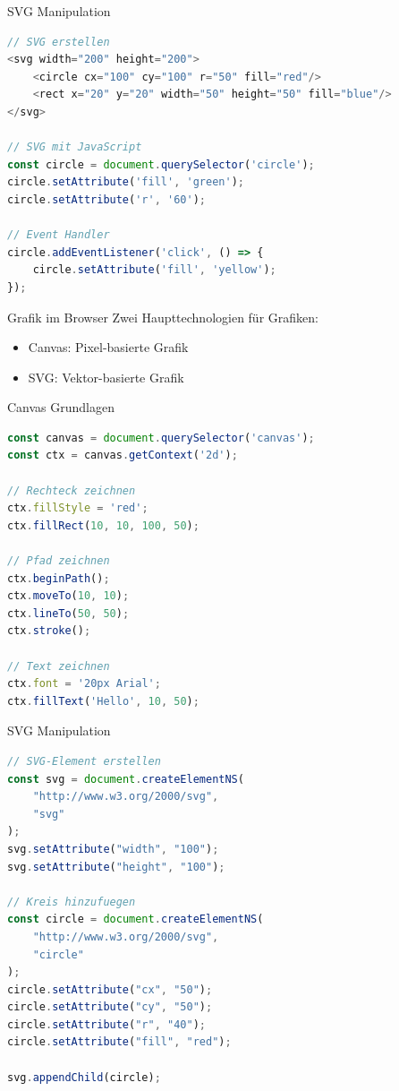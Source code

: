 \begin{KR}{SVG Manipulation}
\begin{lstlisting}[language=JavaScript, style=basesmol]
// SVG erstellen
<svg width="200" height="200">
    <circle cx="100" cy="100" r="50" fill="red"/>
    <rect x="20" y="20" width="50" height="50" fill="blue"/>
</svg>

// SVG mit JavaScript
const circle = document.querySelector('circle');
circle.setAttribute('fill', 'green');
circle.setAttribute('r', '60');

// Event Handler
circle.addEventListener('click', () => {
    circle.setAttribute('fill', 'yellow');
});
\end{lstlisting}
\end{KR}

\begin{concept}{Grafik im Browser}
    Zwei Haupttechnologien für Grafiken:
    \begin{itemize}
        \item Canvas: Pixel-basierte Grafik
        \item SVG: Vektor-basierte Grafik
    \end{itemize}
\end{concept}

\begin{KR}{Canvas Grundlagen}
\begin{lstlisting}[language=JavaScript, style=basesmol]
const canvas = document.querySelector('canvas');
const ctx = canvas.getContext('2d');

// Rechteck zeichnen
ctx.fillStyle = 'red';
ctx.fillRect(10, 10, 100, 50);

// Pfad zeichnen
ctx.beginPath();
ctx.moveTo(10, 10);
ctx.lineTo(50, 50);
ctx.stroke();

// Text zeichnen
ctx.font = '20px Arial';
ctx.fillText('Hello', 10, 50);
\end{lstlisting}
\end{KR}

\begin{KR}{SVG Manipulation}
\begin{lstlisting}[language=JavaScript, style=basesmol]
// SVG-Element erstellen
const svg = document.createElementNS(
    "http://www.w3.org/2000/svg", 
    "svg"
);
svg.setAttribute("width", "100");
svg.setAttribute("height", "100");

// Kreis hinzufuegen
const circle = document.createElementNS(
    "http://www.w3.org/2000/svg", 
    "circle"
);
circle.setAttribute("cx", "50");
circle.setAttribute("cy", "50");
circle.setAttribute("r", "40");
circle.setAttribute("fill", "red");

svg.appendChild(circle);
\end{lstlisting}
\end{KR}

